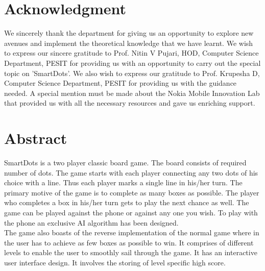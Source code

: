 \documentclass[a4paper,12pt]{article}
\begin{document}
\renewcommand*\rmdefault{ppl}\normalfont\upshape
\renewcommand{\headrulewidth}{0.5pt}
\renewcommand{\footrulewidth}{0.5pt}




\setlength{\headheight}{15.2pt}
\pagestyle{fancy}

\newpage
\section*{\Huge{Acknowledgment}}
\hspace{18pt}We sincerely thank the department for giving us an opportunity to explore new avenues and implement the theoretical knowledge that we have learnt. We wish to express our sincere gratitude to Prof. Nitin V Pujari, HOD, Computer Science Department, PESIT for providing us with an opportunity to carry out the special topic on 'SmartDots'. We also wish to express our gratitude to Prof. Krupesha D, Computer Science Department, PESIT for providing us with the guidance needed. A special mention must be made about the Nokia Mobile Innovation Lab that provided us with all the necessary resources and gave us enriching support.

\newpage
\section*{\Huge{Abstract}}
\hspace{18pt}SmartDots is a two player classic board game. The board consists of required number of dots. The game starts with each player connecting any two dots of his choice with a line. Thus each player marks a single line in his/her turn. The primary motive of the game is to complete as many boxes as possible. The player who completes a box in his/her turn gets to play the next chance as well. The game can be played against the phone or against any one you wish. To play with the phone an exclusive AI algorithm has been designed.\\

The game also boasts of the reverse implementation of the normal game where in the user has to achieve as few boxes as possible to win. It comprises of different levels to enable the user to smoothly sail through the game. It has an interactive user interface design. It involves the storing of level specific high score.
\newpage

\newpage
\tableofcontents

\newpage
\end{document}
